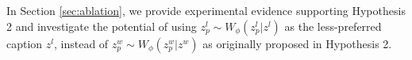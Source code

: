 In Section \ref{sec:ablation}, we provide experimental evidence supporting Hypothesis 2 and investigate the potential of using \( z^{l}_{p} \sim W_{\phi}(z^{l}_{p} | z^l) \) as the less-preferred caption \( z^l \), instead of \( z^{w}_{p} \sim W_{\phi}(z^{w}_{p} | z^w) \) as originally proposed in Hypothesis 2.